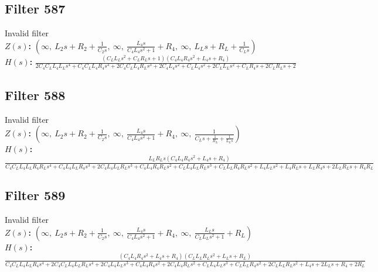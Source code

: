 \documentclass{article}
\begin{document}
\subsection*{Filter 587}
Invalid filter \\ 
\textbf{$Z(s)$:} $\left( \infty, \  L_{2} s + R_{2} + \frac{1}{C_{2} s}, \  \infty, \  \frac{L_{4} s}{C_{4} L_{4} s^{2} + 1} + R_{4}, \  \infty, \  L_{L} s + R_{L} + \frac{1}{C_{L} s}\right)$ \\ 
\textbf{$H(s)$:} $\frac{\left(C_{L} L_{L} s^{2} + C_{L} R_{L} s + 1\right) \left(C_{4} L_{4} R_{4} s^{2} + L_{4} s + R_{4}\right)}{2 C_{4} C_{L} L_{4} L_{L} s^{4} + C_{4} C_{L} L_{4} R_{4} s^{3} + 2 C_{4} C_{L} L_{4} R_{L} s^{3} + 2 C_{4} L_{4} s^{2} + C_{L} L_{4} s^{2} + 2 C_{L} L_{L} s^{2} + C_{L} R_{4} s + 2 C_{L} R_{L} s + 2}$ \\ 
\subsection*{Filter 588}
Invalid filter \\ 
\textbf{$Z(s)$:} $\left( \infty, \  L_{2} s + R_{2} + \frac{1}{C_{2} s}, \  \infty, \  \frac{L_{4} s}{C_{4} L_{4} s^{2} + 1} + R_{4}, \  \infty, \  \frac{1}{C_{L} s + \frac{1}{R_{L}} + \frac{1}{L_{L} s}}\right)$ \\ 
\textbf{$H(s)$:} $\frac{L_{L} R_{L} s \left(C_{4} L_{4} R_{4} s^{2} + L_{4} s + R_{4}\right)}{C_{4} C_{L} L_{4} L_{L} R_{4} R_{L} s^{4} + C_{4} L_{4} L_{L} R_{4} s^{3} + 2 C_{4} L_{4} L_{L} R_{L} s^{3} + C_{4} L_{4} R_{4} R_{L} s^{2} + C_{L} L_{4} L_{L} R_{L} s^{3} + C_{L} L_{L} R_{4} R_{L} s^{2} + L_{4} L_{L} s^{2} + L_{4} R_{L} s + L_{L} R_{4} s + 2 L_{L} R_{L} s + R_{4} R_{L}}$ \\ 
\subsection*{Filter 589}
Invalid filter \\ 
\textbf{$Z(s)$:} $\left( \infty, \  L_{2} s + R_{2} + \frac{1}{C_{2} s}, \  \infty, \  \frac{L_{4} s}{C_{4} L_{4} s^{2} + 1} + R_{4}, \  \infty, \  \frac{L_{L} s}{C_{L} L_{L} s^{2} + 1} + R_{L}\right)$ \\ 
\textbf{$H(s)$:} $\frac{\left(C_{4} L_{4} R_{4} s^{2} + L_{4} s + R_{4}\right) \left(C_{L} L_{L} R_{L} s^{2} + L_{L} s + R_{L}\right)}{C_{4} C_{L} L_{4} L_{L} R_{4} s^{4} + 2 C_{4} C_{L} L_{4} L_{L} R_{L} s^{4} + 2 C_{4} L_{4} L_{L} s^{3} + C_{4} L_{4} R_{4} s^{2} + 2 C_{4} L_{4} R_{L} s^{2} + C_{L} L_{4} L_{L} s^{3} + C_{L} L_{L} R_{4} s^{2} + 2 C_{L} L_{L} R_{L} s^{2} + L_{4} s + 2 L_{L} s + R_{4} + 2 R_{L}}$ \\ 
\end{document}
